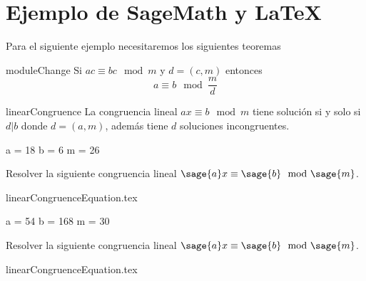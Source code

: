 {\justifying
	\chapter{Ejemplo de SageMath y LaTeX}
	Para el siguiente ejemplo necesitaremos los siguientes teoremas
	\begin{theorem}{}{moduleChange}
    Si ${ac}\equiv{bc}\mod{m}$ y $d=({c},{m})$ entonces
    $${a}\equiv{b}\mod{\frac{m}{d}}$$
  \end{theorem}
	\begin{theorem}{}{linearCongruence}
    La congruencia lineal ${ax}\equiv{b}\mod{m}$ tiene solución si y solo si $d|b$ donde $d=(a,m)$, además tiene $d$ soluciones incongruentes.
  \end{theorem}
  \begin{sagesilent}
    a = 18
    b = 6
    m = 26
  \end{sagesilent}
  \begin{example}{}{}
    Resolver la siguiente congruencia lineal ${\sage{a}x}\equiv{\sage{b}}\mod{\sage{m}}$.
  \end{example}
	\begin{solution}
	  {linearCongruenceEquation.tex}
	\end{solution}
	\begin{sagesilent}
    a = 54
    b = 168
    m = 30
  \end{sagesilent}
  \begin{example}{}{}
    Resolver la siguiente congruencia lineal ${\sage{a}x}\equiv{\sage{b}}\mod{\sage{m}}$.
  \end{example}
	\begin{solution}
	  {linearCongruenceEquation.tex}
	\end{solution}
	
	
	
}\cleanalldata